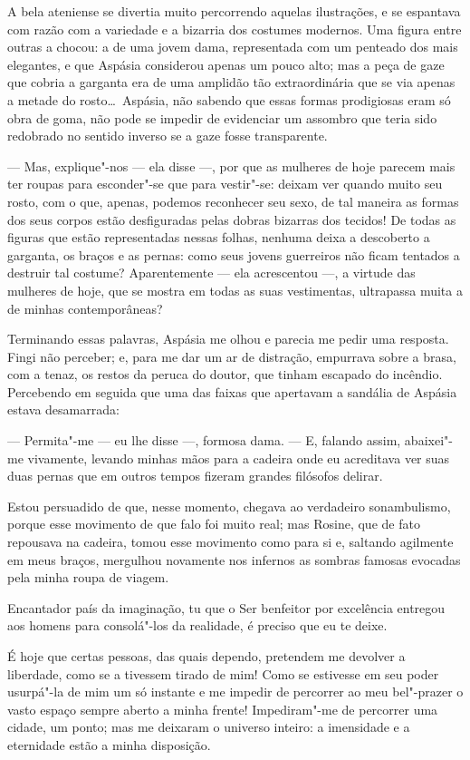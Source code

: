  A bela ateniense se divertia muito percorrendo aquelas ilustrações, e
se espantava com razão com a variedade e a bizarria dos costumes
modernos. Uma figura entre outras a chocou: a de uma jovem dama,
representada com um penteado dos mais elegantes, e que Aspásia
considerou apenas um pouco alto; mas a peça de gaze que cobria a
garganta era de uma amplidão tão extraordinária que se via apenas a
metade do rosto\ldots\ Aspásia, não sabendo que essas formas prodigiosas
eram só obra de goma, não pode se impedir de evidenciar um assombro que
teria sido redobrado no sentido inverso se a gaze fosse transparente.

 --- Mas, explique"-nos --- ela disse ---, por que as mulheres de hoje
parecem mais ter roupas para esconder"-se que para vestir"-se: deixam ver
quando muito seu rosto, com o que, apenas, podemos reconhecer seu sexo,
de tal maneira as formas dos seus corpos estão desfiguradas pelas
dobras bizarras dos tecidos! De todas as figuras que estão
representadas nessas folhas, nenhuma deixa a descoberto a garganta, os
braços e as pernas: como seus jovens guerreiros não ficam tentados a
destruir tal costume? Aparentemente --- ela acrescentou ---, a virtude
das mulheres de hoje, que se mostra em todas as suas vestimentas,
ultrapassa muita a de minhas contemporâneas?

 Terminando essas palavras, Aspásia me olhou e parecia me pedir uma
resposta. Fingi não perceber; e, para me dar um ar de distração,
empurrava sobre a brasa, com a tenaz, os restos da peruca do doutor,
que tinham escapado do incêndio.  Percebendo em seguida que uma das
faixas que apertavam a sandália de Aspásia estava desamarrada:

--- Permita"-me --- eu lhe disse ---, formosa dama. --- E, falando
assim, abaixei"-me vivamente, levando minhas mãos para a cadeira onde eu
acreditava ver suas duas pernas que em outros tempos fizeram grandes
filósofos delirar.

 Estou persuadido de que, nesse momento, chegava ao verdadeiro
sonambulismo, porque esse movimento de que falo foi muito real; mas
Rosine, que de fato repousava na cadeira, tomou esse movimento como
para si e, saltando agilmente em meus braços, mergulhou novamente nos
infernos as sombras famosas evocadas pela minha roupa de viagem.

 Encantador país da imaginação, tu que o Ser benfeitor por excelência
entregou aos homens para consolá"-los da realidade, é preciso que eu te
deixe.

 É hoje que certas pessoas, das quais dependo, pretendem me devolver a
liberdade, como se a tivessem tirado de mim! Como se estivesse em seu
poder usurpá"-la de mim um só instante e me impedir de percorrer ao meu
bel"-prazer o vasto espaço sempre aberto a minha frente! Impediram"-me de
percorrer uma cidade, um ponto; mas me deixaram o universo inteiro: a
imensidade e a eternidade estão a minha disposição.

